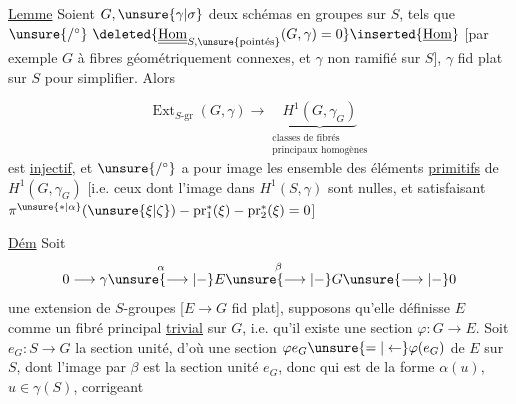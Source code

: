\uline{Lemme} Soient $G,\unsure{\gamma|\sigma}$ deux schémas en groupes  sur $S$, tels que $\unsure{/^{\circ}}\ \deleted{\underline{\underline{\operatorname{Hom}}}_{S,\unsure{\text{pointés}}}(G,\gamma)=0}\inserted{\underline{\operatorname{Hom}}}$ [par exemple $G$ à fibres géométriquement connexes, et $\gamma$ non ramifié sur $S$], $\gamma$ fid plat sur $S$ pour simplifier. Alors

\[
\operatorname{Ext}_{S\text{-gr}}(G,\gamma)\longrightarrow\underbrace{H^1(G,\gamma_G)}_{\substack{\text{classes de fibrés}\\\text{principaux homogènes}}}\tag*{(*)}
\]
est \uline{injectif}, et $\unsure{/^{\circ}}$ a pour image les ensemble des éléments \uline{primitifs} de $H^1(G,\gamma_G)$ [i.e. ceux dont l'image dans $H^1(S,\gamma)$ sont nulles, et satisfaisant $\pi^{\unsure{*|\alpha}}(\unsure{\xi|\zeta})-\operatorname{pr}_1^*(\xi)-\operatorname{pr}_2^*(\xi)=0$]


\uline{Dém} Soit
\[
0\longrightarrow\gamma\overset{\alpha}{\unsure{\longrightarrow|-}}E\overset{\beta}{\unsure{\longrightarrow|-}}G\unsure{\longrightarrow|-}0
\]
une extension de $S$-groupes [$E\longrightarrow G$ fid plat], supposons qu'elle définisse $E$ comme un fibré principal \uline{trivial} sur $G$, i.e. qu'il existe une section $\varphi:G\longrightarrow E$. Soit $e_G:S\longrightarrow G$ la section unité, d'où une section $\varphi e_G\unsure{=|\leftarrow}\varphi(e_G)$ de $E$ sur $S$, dont l'image par $\beta$ est la section unité $e_G$, donc qui est de la forme $\alpha(u)$, $u\in\gamma(S)$, corrigeant
